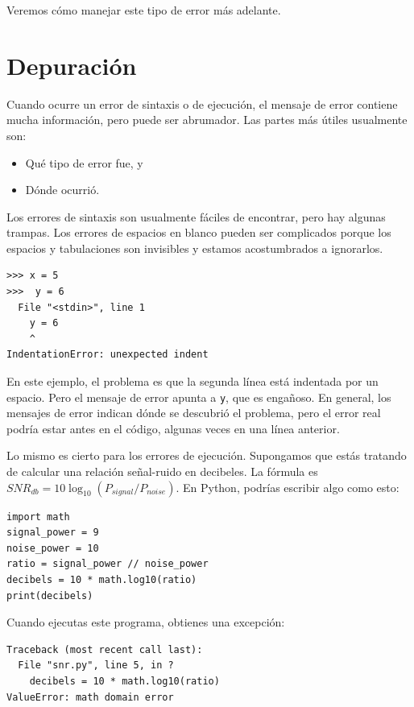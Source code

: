Veremos cómo manejar este tipo de error más adelante.

\section{Depuración}

Cuando ocurre un error de sintaxis o de ejecución, el mensaje de error contiene mucha información, pero puede ser abrumador. Las partes más útiles usualmente son:

\begin{itemize}
\item Qué tipo de error fue, y
\item Dónde ocurrió.
\end{itemize}

Los errores de sintaxis son usualmente fáciles de encontrar, pero hay algunas trampas. Los errores de espacios en blanco pueden ser complicados porque los espacios y tabulaciones son invisibles y estamos acostumbrados a ignorarlos.

\begin{lstlisting}
>>> x = 5
>>>  y = 6
  File "<stdin>", line 1
    y = 6
    ^
IndentationError: unexpected indent
\end{lstlisting}

En este ejemplo, el problema es que la segunda línea está indentada por un espacio. Pero el mensaje de error apunta a \texttt{y}, que es engañoso. En general, los mensajes de error indican dónde se descubrió el problema, pero el error real podría estar antes en el código, algunas veces en una línea anterior.

Lo mismo es cierto para los errores de ejecución. Supongamos que estás tratando de calcular una relación señal-ruido en decibeles. La fórmula es $SNR_{db} = 10 \log_{10}(P_{signal}/P_{noise})$. En Python, podrías escribir algo como esto:

\begin{lstlisting}
import math
signal_power = 9
noise_power = 10
ratio = signal_power // noise_power
decibels = 10 * math.log10(ratio)
print(decibels)
\end{lstlisting}

Cuando ejecutas este programa, obtienes una excepción:

\begin{lstlisting}
Traceback (most recent call last):
  File "snr.py", line 5, in ?
    decibels = 10 * math.log10(ratio)
ValueError: math domain error
\end{lstlisting}

